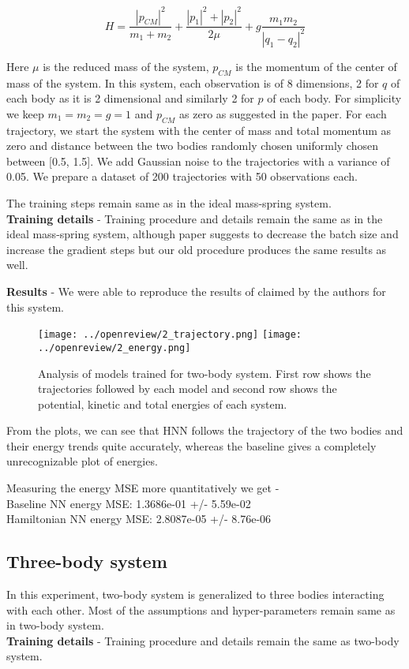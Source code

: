 \begin{equation}
H = \frac{|p_{CM}|^2}{m_1 + m_2} + \frac{|p_1|^2 + |p_2|^2}{2\mu} + g\frac{m_1m_2}{|q_1-q_2|^2}
\end{equation}

Here \(\mu\) is the reduced mass of the system, \(p_{CM}\) is the momentum of the center of mass of the system. In this system, each observation is of 8 dimensions, 2 for \(q\) of each body as it is 2 dimensional and similarly 2 for \(p\) of each body. For simplicity we keep \(m_1 = m_2 = g = 1\) and \(p_{CM}\) as zero as suggested in the paper.
For each trajectory, we start the system with the center of mass and total momentum as zero and distance between the two bodies randomly chosen uniformly chosen between [0.5, 1.5]. We add Gaussian noise to the trajectories with a variance of 0.05. We prepare a dataset of 200 trajectories with 50 observations each.

The training steps remain same as in the ideal mass-spring system.\\
\textbf{Training details} - Training procedure and details remain the same as in the ideal mass-spring system, although paper suggests to decrease the batch size and increase the gradient steps but our old procedure produces the same results as well.

\textbf{Results} - We were able to reproduce the results of claimed by the authors for this system.
\begin{figure}[htp]
    \centering
    \texttt{[image: ../openreview/2\_trajectory.png]}
    \texttt{[image: ../openreview/2\_energy.png]}
    \caption{Analysis of models trained for two-body system. First row shows the trajectories followed by each model and second row shows the potential, kinetic and total energies of each system.}
    \label{fig:galaxy}
\end{figure}

From the plots, we can see that HNN follows the trajectory of the two bodies and their energy trends quite accurately, whereas the baseline gives a completely unrecognizable plot of energies.

Measuring the energy MSE more quantitatively we get -\\
Baseline NN energy MSE: 1.3686e-01 +/- 5.59e-02\\
Hamiltonian NN energy MSE: 2.8087e-05 +/- 8.76e-06

\subsection{Three-body system}
In this experiment, two-body system is generalized to three bodies interacting with each other.
Most of the assumptions and hyper-parameters remain same as in two-body system.\\
\textbf{Training details} - Training procedure and details remain the same as two-body system.

